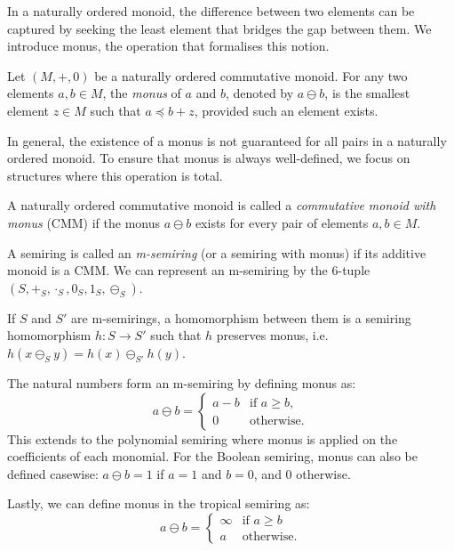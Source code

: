 \documentclass[oneside, 11pt]{amsbook}
\theoremstyle{plain}
\theoremstyle{definition}
\theoremstyle{remark}
\begin{document}
In a naturally ordered monoid, the difference between two elements can be captured by seeking the least element that bridges the gap between them. We introduce monus, the operation that formalises this notion.

\begin{defn}[Monus]
    Let $(M, +, 0)$ be a naturally ordered commutative monoid. For any two elements $a, b \in M$, the \emph{monus} of $a$ and $b$, denoted by $a \ominus b$, is the smallest element $z \in M$ such that $a \preccurlyeq b + z$, provided such an element exists.
\end{defn}

In general, the existence of a monus is not guaranteed for all pairs in a naturally ordered monoid. To ensure that monus is always well-defined, we focus on structures where this operation is total.

\begin{defn}
    A naturally ordered commutative monoid is called a \emph{commutative monoid with monus} (CMM) if the monus $a \ominus b$ exists for every pair of elements $a, b \in M$.
\end{defn}

\begin{defn}[M-semiring]
    A semiring is called an \emph{m-semiring} (or a semiring with monus) if its additive monoid is a CMM. We can represent an m-semiring by the 6-tuple $(S, +_S, \cdot_S, 0_S, 1_S, \ominus_S)$.

    If $S$ and $S'$ are m-semirings, a homomorphism between them is a semiring homomorphism $h: S \to S'$ such that $h$ preserves monus, i.e. $h(x \ominus_S y) = h(x) \ominus_{S'} h(y)$.
\end{defn}

\begin{exmpl}
    The natural numbers form an m-semiring by defining monus as:
    \[
        a \ominus b =
        \begin{cases}
            a - b & \text{if }a \ge b, \\
            0     & \text{otherwise.}
        \end{cases}
    \]
    This extends to the polynomial semiring where monus is applied on the coefficients of each monomial. For the Boolean semiring, monus can also be defined casewise: $a \ominus b = 1$ if $a=1$ and $b=0$, and $0$ otherwise.

    Lastly, we can define monus in the tropical semiring as:
    \[
        a \ominus b = \begin{cases}
            \infty & \text{if }a \ge b \\
            a      & \text{otherwise.}
        \end{cases}
    \]
\end{exmpl}
\end{document}
